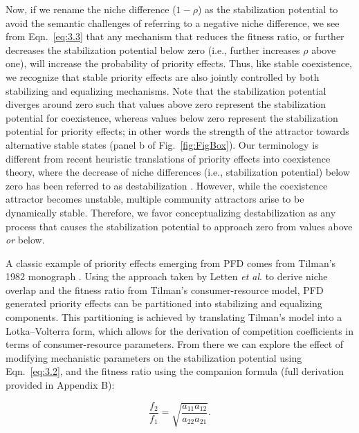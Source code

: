 \noindent Now, if we rename the niche difference ($1-\rho$) as the stabilization potential to avoid the semantic challenges of referring to a negative niche difference, we see from Eqn.~\ref{eq:3.3} that any mechanism that reduces the fitness ratio, or further decreases the stabilization potential below zero (i.e., further increases $\rho$ above one), will increase the probability of priority effects. Thus, like stable coexistence, we recognize that stable priority effects are also jointly controlled by both stabilizing and equalizing mechanisms. Note that the stabilization potential diverges around zero such that values above zero represent the stabilization potential for coexistence, whereas values below zero represent the stabilization potential for priority effects; in other words the strength of the attractor towards alternative stable states (panel b of Fig.~\ref{fig:FigBox}). Our terminology is different from recent heuristic translations of priority effects into coexistence theory, where the decrease of niche differences (i.e., stabilization potential) below zero has been referred to as destabilization \citep{Mordecai2011, Fukami2016}. However, while the coexistence attractor becomes unstable, multiple community attractors arise to be dynamically stable. Therefore, we favor conceptualizing destabilization as any process that causes the stabilization potential to approach zero from values above \textit{or} below. 
\par
 
 
A classic example of priority effects emerging from PFD comes from Tilman's 1982 monograph \cite{tilman1982}. Using the approach taken by Letten \textit{et al}.\cite{Letten2017} to derive niche overlap and the fitness ratio from Tilman's consumer-resource model, PFD generated priority effects can be partitioned into stabilizing and equalizing components. This partitioning is achieved by translating Tilman's model into a Lotka--Volterra form, which allows for the derivation of competition coefficients in terms of consumer-resource parameters. From there we can explore the effect of modifying mechanistic parameters on the stabilization potential using Eqn.~\ref{eq:3.2}, and the fitness ratio using the companion formula \citep{Chesson2008b, Chesson2013ecosys} (full derivation provided in Appendix B):

\begin{equation}
\frac{f_{2}}{f_{1}}=\sqrt {\frac{{{a_{11}}{a_{12}}}}{{{a_{22}}{a_{21}}}}}.
\tag{3.4}\label{eq:3.4}
\end{equation}

